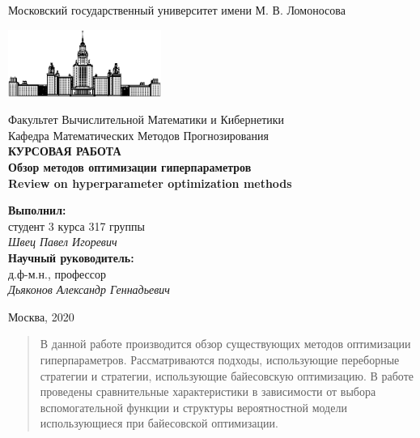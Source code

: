\documentclass[12pt,fleqn]{article}
\begin{document}
\begin{titlepage}
\begin{center}
    
	Московский государственный университет имени М. В. Ломоносова
	
    \includegraphics[width=50mm]{msu.eps}

    \bigskip
    
    
    Факультет Вычислительной Математики и Кибернетики\\
    Кафедра Математических Методов Прогнозирования\\[20mm]

    \textsf{\large\bfseries
        КУРСОВАЯ РАБОТА \\[10mm]
        Обзор методов оптимизации гиперпараметров \\
        Review on hyperparameter optimization methods 
    }\\[15mm]

    \begin{flushright}
        \parbox{0.5\textwidth}{
            \textbf{Выполнил:}\\
            студент 3 курса 317 группы\\
            \emph{Швец Павел Игоревич}\\[5mm]
            \textbf{Научный руководитель:}\\
            д.ф-м.н., профессор\\
            \emph{Дьяконов Александр Геннадьевич}
        }
    \end{flushright}

    \vspace{\fill}
    Москва, 2020
\end{center}
\end{titlepage}

\newpage
\renewcommand{\contentsname}{Содержание}
\tableofcontents

\newpage
\begin{abstract}
    В данной работе производится обзор существующих методов оптимизации гиперпараметров. Рассматриваются подходы, использующие переборные стратегии и стратегии, использующие байесовскую оптимизацию. В работе проведены сравнительные характеристики в зависимости от выбора вспомогательной функции и структуры вероятностной модели использующиеся при байесовской оптимизации.
\end{abstract}
\end{document}
